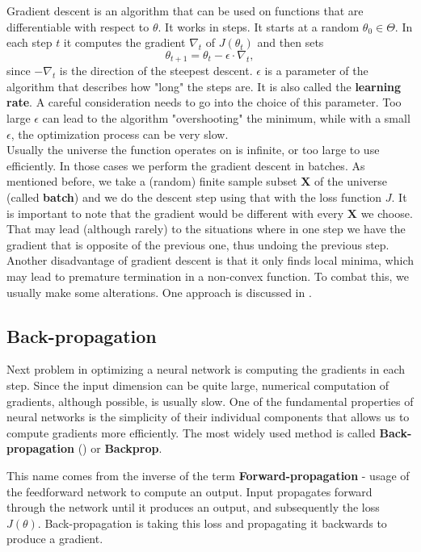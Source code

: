 Gradient descent is an algorithm that can be used on functions that are differentiable with respect to $\theta$. It works in steps. It starts at a random $\theta_0 \in \Theta$. In each step $t$ it computes the gradient $\nabla_t$ of $J(\theta_t)$ and then sets $$\theta_{t+1}=\theta_t-\epsilon\cdot\nabla_t,$$ since $-\nabla_t$ is the direction of the steepest descent. $\epsilon$ is a parameter of the algorithm that describes how "long" the steps are. It is also called the \textbf{learning rate}. A careful consideration needs to go into the choice of this parameter. Too large $\epsilon$ can lead to the algorithm "overshooting" the minimum, while with a small $\epsilon$, the optimization process can be very slow.\\

Usually the universe the function operates on is infinite, or too large to use efficiently. In those cases we perform the gradient descent in batches. As mentioned before, we take a (random) finite sample subset $\textbf{X}$ of the universe (called \textbf{batch}) and we do the descent step using that with the loss function $J$. It is important to note that the gradient would be different with every $\textbf{X}$ we choose. That may lead (although rarely) to the situations where in one step we have the gradient that is opposite of the previous one, thus undoing the previous step. Another disadvantage of gradient descent is that it only finds local minima, which may lead to premature termination in a non-convex function. To combat this, we usually make some alterations. One approach is discussed in .

\subsection{Back-propagation}
\label{section:backprop}
Next problem in optimizing a neural network is computing the gradients in each step. Since the input dimension can be quite large, numerical computation of gradients, although possible, is usually slow. One of the fundamental properties of neural networks is the simplicity of their individual components that allows us to compute gradients more efficiently. The most widely used method is called \textbf{Back-propagation} (\cite{backprop}) or \textbf{Backprop}.

This name comes from the inverse of the term \textbf{Forward-propagation} - usage of the feedforward network to compute an output. Input propagates forward through the network until it produces an output, and subsequently the loss $J(\theta)$. Back-propagation is taking this loss and propagating it backwards to produce a gradient.

